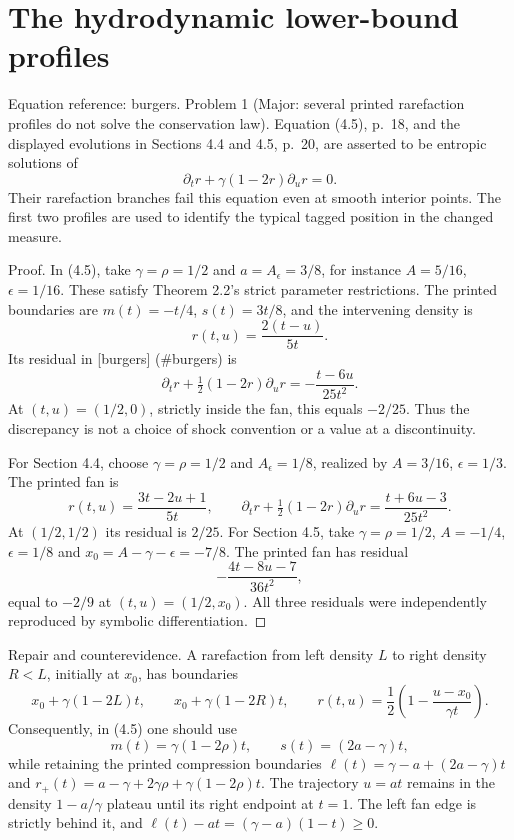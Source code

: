 \documentclass[10pt]{article}
\begin{document}
\section*{The hydrodynamic lower-bound profiles}
Equation reference: burgers. Problem 1 (Major: several printed rarefaction profiles do not solve the conservation law).  Equation (4.5), p. 18, and the displayed evolutions in Sections 4.4 and 4.5, p. 20, are asserted to be entropic solutions of \[
 \partial_t r+\gamma(1-2r)\partial_u r=0.\] Their rarefaction branches fail this equation even at smooth interior points. The first two profiles are used to identify the typical tagged position in the changed measure.\par
Proof. In (4.5), take \(\gamma=\rho=1/2\) and \(a=A_\epsilon=3/8\), for instance \(A=5/16\), \(\epsilon=1/16\). These satisfy Theorem 2.2’s strict parameter restrictions. The printed boundaries are \(m(t)=-t/4\), \(s(t)=3t/8\), and the intervening density is \[r(t,u)=\frac{2(t-u)}{5t}.\] Its residual in [burgers] (\#burgers) is \[\partial_t r+\tfrac12(1-2r)\partial_u r
       =-\frac{t-6u}{25t^2}.\] At \((t,u)=(1/2,0)\), strictly inside the fan, this equals \(-2/25\). Thus the discrepancy is not a choice of shock convention or a value at a discontinuity.\par
For Section 4.4, choose \(\gamma=\rho=1/2\) and \(A_\epsilon=1/8\), realized by \(A=3/16\), \(\epsilon=1/3\). The printed fan is \[r(t,u)=\frac{3t-2u+1}{5t},\qquad
 \partial_t r+\tfrac12(1-2r)\partial_u r
       =\frac{t+6u-3}{25t^2}.\] At \((1/2,1/2)\) its residual is \(2/25\). For Section 4.5, take \(\gamma=\rho=1/2\), \(A=-1/4\), \(\epsilon=1/8\) and \(x_0=A-\gamma-\epsilon=-7/8\). The printed fan has residual \[-\frac{4t-8u-7}{36t^2},\] equal to \(-2/9\) at \((t,u)=(1/2,x_0)\). All three residuals were independently reproduced by symbolic differentiation. ◻\par
Repair and counterevidence. A rarefaction from left density \(L\) to right density \(R<L\), initially at \(x_0\), has boundaries \[x_0+\gamma(1-2L)t,\qquad x_0+\gamma(1-2R)t,
 \qquad
 r(t,u)=\frac12\left(1-\frac{u-x_0}{\gamma t}\right).\] Consequently, in (4.5) one should use \[m(t)=\gamma(1-2\rho)t,\qquad s(t)=(2a-\gamma)t,\] while retaining the printed compression boundaries \(\ell(t)=\gamma-a+(2a-\gamma)t\) and \(r_+(t)=a-\gamma+2\gamma\rho+\gamma(1-2\rho)t\). The trajectory \(u=at\) remains in the density \(1-a/\gamma\) plateau until its right endpoint at \(t=1\). The left fan edge is strictly behind it, and \(\ell(t)-at=(\gamma-a)(1-t)\geq0\).\par
\end{document}
